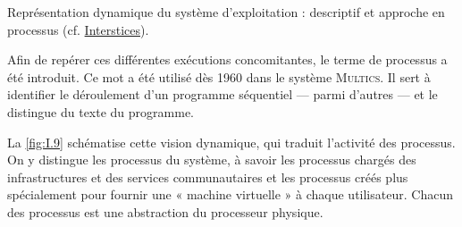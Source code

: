 \begin{marginfigure}
\caption{\label{fig:I.9}Représentation dynamique du système d'exploitation : descriptif et approche en processus (cf. \href{https://interstices.info/a-quoi-sert-un-systeme-dexploitation/}{Interstices}).}
\end{marginfigure}

Afin de repérer ces différentes exécutions concomitantes, le terme de processus a été introduit. Ce mot a été utilisé dès 1960 dans le système \textsc{Multics}. Il sert à identifier le déroulement d’un programme séquentiel ---  parmi d’autres --- et le distingue du texte du programme. 

La \cref{fig:I.9} schématise cette vision dynamique, qui traduit l’activité des processus. On y distingue les processus du système, à savoir les processus chargés des infrastructures et des services communautaires et les processus créés plus spécialement pour fournir une « machine virtuelle » à chaque utilisateur. Chacun des processus est une abstraction du processeur physique.


